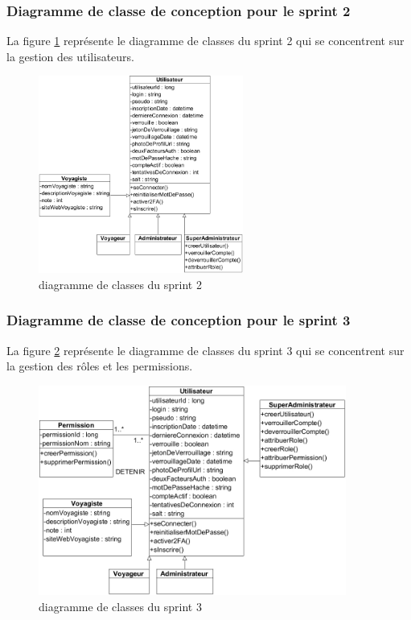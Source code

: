 \documentclass[12pt]{report}
\begin{document}
				\subsubsection{Diagramme de classe de conception pour le sprint 2}
				
			           \hspace{15pt} La figure \ref{fig:sprint2} représente le diagramme de classes du sprint 2 qui se concentrent sur la gestion des utilisateurs.

			\begin{figure}[h]
				\centering
				\includegraphics[width=0.6\textwidth]{sprint2.jpg}
				\caption{diagramme de classes du sprint 2}
				\label{fig:sprint2}
			\end{figure}
			\FloatBarrier

			\subsubsection{Diagramme de classe de conception pour le sprint 3}
				
			\hspace{15pt} La figure \ref{fig:sprint3} représente le diagramme de classes du sprint 3 qui se concentrent sur la gestion des rôles et
les permissions.


			\begin{figure}[h]
				\centering
				\includegraphics[width=0.9\textwidth]{sprint3.jpg}
				\caption{diagramme de classes du sprint 3}
				\label{fig:sprint3}
			\end{figure}
			\FloatBarrier
\end{document}
